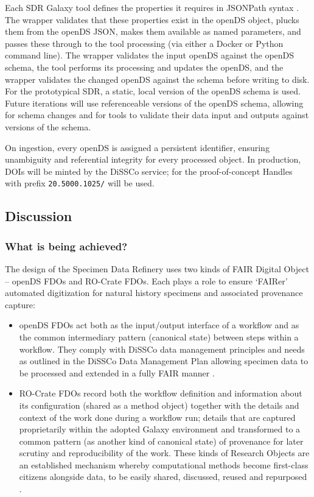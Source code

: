 Each SDR Galaxy tool defines the properties it requires in JSONPath
syntax \cite{ch8-60}. The wrapper validates that these properties exist in
the openDS object, plucks them from the openDS JSON, makes them
available as named parameters, and passes these through to the tool
processing (via either a Docker or Python command line). The wrapper
validates the input openDS against the openDS schema, the tool performs
its processing and updates the openDS, and the wrapper validates the
changed openDS against the schema before writing to disk. For the
prototypical SDR, a static, local version of the openDS schema is used.
Future iterations will use referenceable versions of the openDS schema,
allowing for schema changes and for tools to validate their data input
and outputs against versions of the schema.

On ingestion, every openDS is assigned a persistent identifier, ensuring
unambiguity and referential integrity for every processed object. In
production, DOIs will be minted by the DiSSCo service; for the
proof-of-concept Handles with prefix \texttt{20.5000.1025/} will be
used.

\subsection{Discussion}\label{ch8:discussion}

\subsubsection{What is being achieved?}\label{ch8:what-is-being-achieved}

The design of the Specimen Data Refinery uses two kinds of FAIR Digital
Object -- openDS FDOs and RO-Crate FDOs. Each plays a role to ensure
`FAIRer' automated digitization for natural history specimens and
associated provenance capture:

\begin{itemize}
\item
  openDS FDOs act both as the input/output interface of a workflow and
  as the common intermediary pattern (canonical state) between steps
  within a workflow. They comply with DiSSCo data management principles
  and needs as outlined in the DiSSCo Data Management Plan \cite{ch8-28}
  allowing specimen data to be processed and extended in a fully FAIR
  manner \cite{ch8-6}.
\item
  RO-Crate FDOs record both the workflow definition and information
  about its configuration (shared as a method object) together with the
  details and context of the work done during a workflow run; details
  that are captured proprietarily within the adopted Galaxy environment
  and transformed to a common pattern (as another kind of canonical
  state) of provenance for later scrutiny and reproducibility of the
  work. These kinds of Research Objects \cite{Bechhofer 2013} are an established
  mechanism whereby computational methods become first-class citizens
  alongside data, to be easily shared, discussed, reused and repurposed
  \cite{ch8-57}.
\end{itemize}

